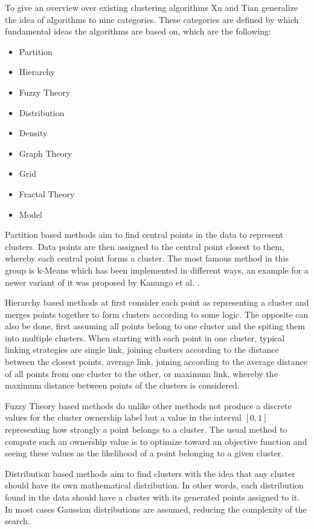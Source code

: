 \documentclass[
	a4paper,
	english,
	twoside,
	openright,               
	11pt                            
	]{report}
\begin{document}
To give an overview over existing clustering algorithms Xu and Tian \cite{surveyclustering} generalize the idea of algorithms to nine categories. These categories are defined by which fundamental ideas the algorithms are based on, which are the following:
\begin{itemize}
  \item Partition
  \item Hierarchy
  \item Fuzzy Theory
  \item Distribution
  \item Density
  \item Graph Theory
  \item Grid
  \item Fractal Theory
  \item Model
\end{itemize}

Partition based methods aim to find central points in the data to represent clusters. Data points are then assigned to the central point closest to them, whereby each central point forms a cluster. The most famous method in this group is k-Means which has been implemented in different ways, an example for a newer variant of it was proposed by Kanungo et al. \cite{1017616}.

Hierarchy based methods at first consider each point as representing a cluster and merges points together to form clusters according to some logic. The opposite can also be done, first assuming all points belong to one cluster and the spiting them into multiple clusters. When starting with each point in one cluster, typical linking strategies are single link, joining clusters according to the distance between the closest points, average link, joining according to the average distance of all points from one cluster to the other, or maximum link, whereby the maximum distance between points of the clusters is considered.

Fuzzy Theory based methods do unlike other methods not produce a discrete values for the cluster ownership label but a value in the interval $[0,1]$ representing how strongly a point belongs to a cluster. The usual method to compute such an ownership value is to optimize toward an objective function and seeing these values as the likelihood of a point belonging to a given cluster.

Distribution based methods aim to find clusters with the idea that any cluster should have its own mathematical distribution. In other words, each distribution found in the data should have a cluster with its generated points assigned to it. In most cases Gaussian distributions are assumed, reducing the complexity of the search.
\end{document}
